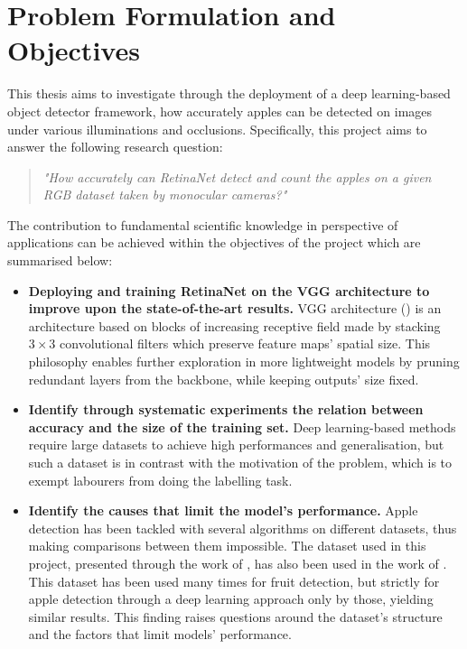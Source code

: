 \section{Problem Formulation and Objectives}
This thesis aims to investigate through the deployment of a deep learning-based object detector framework, how accurately apples can be detected on images under various illuminations and occlusions. Specifically, this project aims to answer the following research question:

\begin{quote}
\centering 
\textit{"How accurately can RetinaNet detect and count the apples on a given RGB dataset taken by monocular cameras?"}
\end{quote}

The contribution to fundamental scientific knowledge in perspective of applications can be achieved within the objectives of the project which are summarised below:

\begin{itemize}
\item \textbf{Deploying and training RetinaNet on the VGG architecture to improve upon the state-of-the-art results.} VGG architecture (\cite{simonyan2014very}) is an architecture based on blocks of increasing receptive field made by stacking $3\times3$ convolutional filters which preserve feature maps' spatial size. This philosophy enables further exploration in more lightweight models by pruning redundant layers from the backbone, while keeping outputs' size fixed.  
\item \textbf{Identify through systematic experiments the relation between accuracy and the size of the training set.} Deep learning-based methods require large datasets to achieve high performances and generalisation, but such a dataset is in contrast with the motivation of the problem, which is to exempt labourers from doing the labelling task.
\item \textbf{Identify the causes that limit the model's performance.} Apple detection has been tackled with several algorithms on different datasets, thus making comparisons between them impossible. The dataset used in this project, presented through the work of \cite{bargoti2017deep}, has also been used in the work of \cite{liang2018apple}. This dataset has been used many times for fruit detection, but strictly for apple detection through a deep learning approach only by those, yielding similar results. This finding raises questions around the dataset's structure and the factors that limit models' performance.

\end{itemize}

